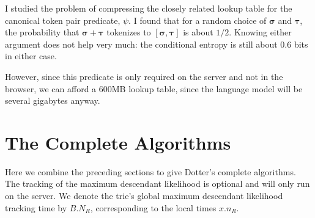 I studied the problem of compressing the closely related
lookup table for the canonical token pair predicate, $\psi$.
I found that for a random choice of $\boldsymbol{\sigma}$ and $\boldsymbol{\tau}$, the probability that $\boldsymbol{\sigma} + \boldsymbol{\tau}$ tokenizes to $[\boldsymbol{\sigma}, \boldsymbol{\tau}]$ is about $1/2$.
Knowing either argument does not help very much: the conditional entropy is still about $0.6$ bits in either case.

However, since this predicate is only required on the server and not in the browser, we can afford a 600MB lookup table,
since the language model will be several gigabytes anyway.

\section{The Complete Algorithms}
\label{sec:complete-algorithms}
Here we combine the preceding sections
to give Dotter's complete algorithms.
The tracking of the maximum descendant likelihood
is optional and will only run on the server.
We denote the trie's global maximum descendant likelihood tracking time by $B.N_R$,
corresponding to the local times $x.n_R$.


